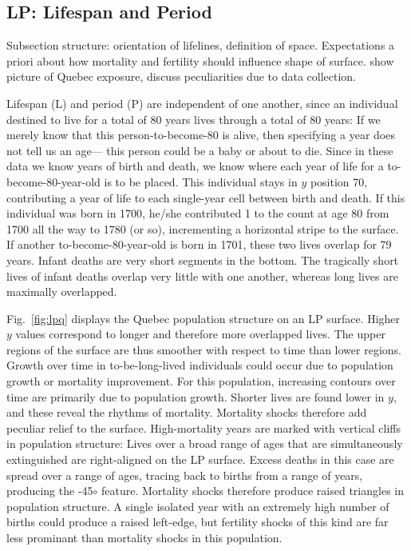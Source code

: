 \subsection{LP: Lifespan and Period}

Subsection structure: orientation of lifelines, definition of space.
Expectations a priori about how mortality and fertility should influence shape
of surface. show picture of Quebec exposure, discuss peculiarities due to data
collection.

Lifespan (L) and period (P) are independent of one another, since an individual
destined to live for a total of 80 years lives through a total of 80 years:
If we merely know that this person-to-become-80 is alive, then specifying a
year does not tell us an age--- this person could be a baby or about to
die. Since in these data we know years of birth and death, we know where each
year of life for a to-become-80-year-old is to be placed. This individual stays
in $y$ position 70, contributing a year of life to each single-year cell between
birth and death. If this individual was born in 1700, he/she contributed 1 to
the count at age 80 from 1700 all the way to 1780 (or so), incrementing a
horizontal stripe to the surface. If another to-become-80-year-old is born
in 1701, these two lives overlap for 79 years. Infant deaths are very short
segments in the bottom. The tragically short lives of infant deaths overlap very
little with one another, whereas long lives are maximally overlapped.

Fig.~\ref{fig:lpq} displays the Quebec population structure on an LP surface.
Higher $y$ values correspond to longer and therefore more overlapped lives. The
upper regions of the surface are thus smoother with respect to time than lower
regions. Growth over time in to-be-long-lived individuals could occur due to
population growth or mortality improvement. For this population, increasing contours over time are primarily
due to population growth. Shorter lives are found lower in $y$, and these reveal
the rhythms of mortality. Mortality
shocks therefore add peculiar relief to the surface. High-mortality years are
marked with vertical cliffs in population structure: Lives over a broad range of
ages that are simultaneously extinguished are right-aligned on the LP surface.
Excess deaths in this case are spread over a range of ages, tracing back to
births from a range of years, producing the -45$\circ$ feature. Mortality shocks
therefore produce raised triangles in population structure. A single
isolated year with an extremely high number of births could produce a raised
left-edge, but fertility shocks of this kind are far less prominant than
mortality shocks in this population.

